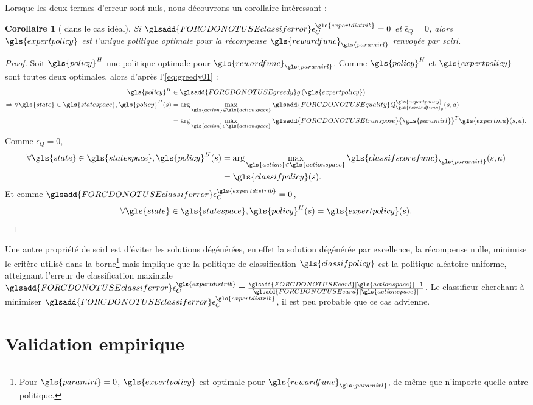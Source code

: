 \documentclass[frenchb,a4paper,justified,notoc]{tufte-book}
\newcommand{\rewardfunc}{\gls{rewardfunc}}
\newcommand{\paramirl}{\gls{paramirl}}
\newcommand{\expertmu}{\gls{expertmu}}
\newcommand{\classifscorefunc}{\gls{classifscorefunc}}
\newcommand{\state}{\gls{state}}
\newcommand{\action}{\gls{action}}
\newcommand{\statespace}{\gls{statespace}}
\newcommand{\expertpolicy}{\gls{expertpolicy}}
\newcommand{\classifpolicy}{\gls{classifpolicy}}
\newcommand{\actionspace}{\gls{actionspace}}
\newcommand{\policy}{\gls{policy}}
\newcommand{\expertdistrib}{\gls{expertdistrib}}
\newcommand{\quality}[2]{\ensuremath{\glsadd{FORCDONOTUSEquality}Q^{#1}_{#2}}}
\newcommand{\classiferror}[1]{\ensuremath{\glsadd{FORCDONOTUSEclassiferror}\epsilon_C^{#1}}}
\newcommand{\transpose}[1]{\ensuremath{\glsadd{FORCDONOTUSEtranspose}{#1}^{T}}}
\newcommand{\greedy}[1]{\ensuremath{\glsadd{FORCDONOTUSEgreedy}g\left(#1\right)}}
\newcommand{\card}[1]{\ensuremath{\glsadd{FORCDONOTUSEcard}\left|#1\right|}}
\newtheorem{corollary}{Corollaire}
\begin{document}
Lorsque les deux termes d'erreur sont nuls, nous découvrons un corollaire intéressant :
\begin{corollary}[ dans le cas idéal]
\label{thm:coroscirl}
Si $\classiferror{\expertdistrib} = 0$ et $\bar\epsilon_Q = 0$, alors $\expertpolicy$ est l'unique politique optimale pour la récompense $\rewardfunc_{\paramirl}$ renvoyée par \gls{scirl}.
\end{corollary}
\begin{proof}
Soit $\policy^H$ une politique optimale pour $\rewardfunc_{\paramirl}$. Comme $\policy^H$ et $\expertpolicy$ sont toutes deux optimales, alors d'après l'\autoref{eq:greedy01} :
\begin{align}
\policy^H &\in \greedy{\expertpolicy}\\
\Rightarrow \forall \state \in \statespace, \policy^H(s) &= \arg\max_{\action \in \actionspace}\quality{\expertpolicy}{\rewardfunc_\theta}(s,a)\\
&=\arg\max_{\action \in \actionspace}\transpose{\paramirl}\expertmu(s,a).
\end{align}
Comme $\bar\epsilon_Q = 0$,
\begin{align}
\forall \state \in \statespace, \policy^H(s) &= \arg\max_{\action \in \actionspace}\classifscorefunc_{\paramirl}(s,a)\\
&=\classifpolicy(s).
\end{align}
Et comme $\classiferror{\expertdistrib} = 0$,
\begin{equation}
\forall \state \in \statespace, \policy^H(s) = \expertpolicy(s).
\end{equation}
\end{proof}

Une autre propriété de \gls{scirl} est d'éviter les solutions dégénérées, en effet la solution dégénérée par excellence, la récompense nulle, minimise le critère utilisé dans la borne\footnote{Pour $\paramirl=0$, $\expertpolicy$ est optimale pour $\rewardfunc_{\paramirl}$, de même que n'importe quelle autre politique.
 } mais implique que la politique de classification $\classifpolicy$ est la politique aléatoire uniforme, atteignant l'erreur de classification maximale $\classiferror{\expertdistrib} = \frac{\card{\actionspace}-1}{\card{\actionspace}}$. Le classifieur cherchant à minimiser $\classiferror{\expertdistrib}$, il est peu probable que ce cas advienne.
\section{Validation empirique}
\label{sec-5-4}
\label{hier-scirlexp}
\end{document}
